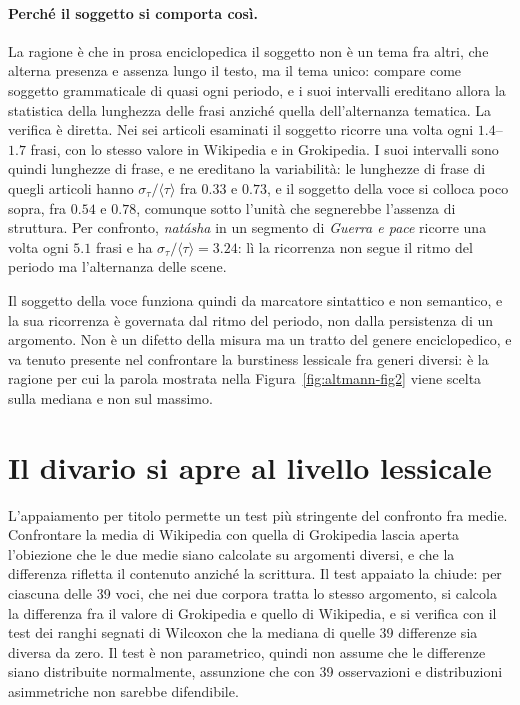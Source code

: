 \paragraph{Perché il soggetto si comporta così.}
La ragione è che in prosa enciclopedica il soggetto non è un tema fra altri,
che alterna presenza e assenza lungo il testo, ma il tema unico: compare come soggetto grammaticale di quasi ogni
periodo, e i suoi intervalli ereditano allora la statistica della lunghezza
delle frasi anziché quella dell'alternanza tematica. La verifica è diretta.
Nei sei articoli esaminati il soggetto ricorre una volta ogni $1.4$--$1.7$
frasi, con lo stesso valore in Wikipedia e in Grokipedia. I suoi intervalli sono
quindi lunghezze di frase, e ne ereditano la variabilità: le
lunghezze di frase di quegli articoli hanno
$\sigma_\tau/\langle\tau\rangle$ fra $0.33$ e $0.73$, e il soggetto della voce
si colloca poco sopra, fra $0.54$ e $0.78$, comunque sotto l'unità che
segnerebbe l'assenza di struttura. Per confronto, \emph{natásha} in un segmento
di \emph{Guerra e pace} ricorre una volta ogni $5.1$ frasi e ha
$\sigma_\tau/\langle\tau\rangle = 3.24$: lì la ricorrenza non segue il ritmo del
periodo ma l'alternanza delle scene.

Il soggetto della voce funziona quindi da marcatore sintattico e non semantico,
e la sua ricorrenza è governata dal ritmo del periodo, non dalla persistenza di
un argomento. Non è un difetto della misura ma un tratto del genere
enciclopedico, e va tenuto presente nel confrontare la burstiness lessicale fra
generi diversi: è la ragione per cui la parola mostrata nella
Figura~\ref{fig:altmann-fig2} viene scelta sulla mediana e non sul massimo.

\section{Il divario si apre al livello lessicale}
\label{sec:appaiato}

L'appaiamento per titolo permette un test più stringente del confronto fra
medie. Confrontare la media di Wikipedia con quella di Grokipedia lascia
aperta l'obiezione che le due medie siano calcolate su argomenti diversi, e
che la differenza rifletta il contenuto anziché la scrittura. Il test appaiato
la chiude: per ciascuna delle \num{39} voci, che nei due corpora tratta lo
stesso argomento, si calcola la differenza fra il valore di Grokipedia e
quello di Wikipedia, e si verifica con il test dei ranghi segnati di Wilcoxon
che la mediana di quelle \num{39} differenze sia diversa da zero. Il test è
non parametrico, quindi non assume che le differenze siano distribuite
normalmente, assunzione che con \num{39} osservazioni e distribuzioni
asimmetriche non sarebbe difendibile.

